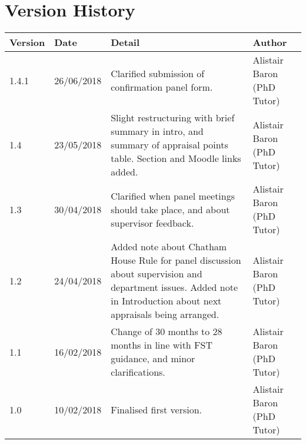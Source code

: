 \documentclass[12pt,a4paper]{article}
\begin{document}
\section{Version History}
\begin{tabularx}{\textwidth}{llXl}
	\textbf{Version} & \textbf{Date} & \textbf{Detail} & \textbf{Author} \\ 
	\hline
	1.4.1 & 26/06/2018 & Clarified submission of confirmation panel form. & Alistair Baron (PhD Tutor) \\
	1.4 & 23/05/2018 & Slight restructuring with brief summary in intro, and summary of appraisal points table. Section and Moodle links added. & Alistair Baron (PhD Tutor) \\
	1.3 & 30/04/2018 & Clarified when panel meetings should take place, and about supervisor feedback. & Alistair Baron (PhD Tutor) \\
	1.2	& 24/04/2018 & Added note about Chatham House Rule for panel discussion about supervision and department issues. Added note in Introduction about next appraisals being arranged. & Alistair Baron (PhD Tutor) \\
	1.1	& 16/02/2018 & Change of 30 months to 28 months in line with FST guidance, and minor clarifications. & Alistair Baron (PhD Tutor) \\
	1.0 & 10/02/2018 & Finalised first version. & Alistair Baron (PhD Tutor) \\ 
\end{tabularx} 
\end{document}
